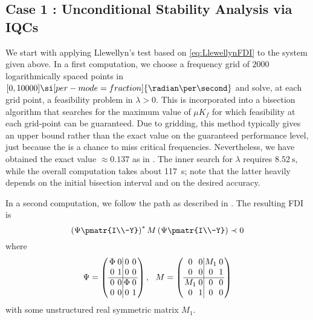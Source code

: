 \subsection{Case 1 : Unconditional Stability Analysis via IQCs}\label{sec:numcase1}
We start with applying Llewellyn's test based on \eqref{eq:LlewellynFDI} to the system given above. In a first computation, we choose a frequency grid of $2000$ logarithmically spaced points in $[0,10000] \si[per-mode=fraction]{\radian\per\second}$ and solve, at each grid point, a feasibility problem in $\lambda>0$. This is incorporated into a bisection algorithm that searches for the maximum value of $\mu K_f$ for which feasibility at each grid-point can be guaranteed. Due to gridding, this method typically gives an upper bound rather than the exact value on the guaranteed performance level, just because the is a chance to miss critical frequencies. Nevertheless, we have obtained the exact value $\approx 0.137$ as in  \cite{willaert}. The inner search for $\lambda$ requires $\SI{8.52}{\second}$, while the overall computation takes about \SI{117}{\second}; note that the latter heavily depends on the initial bisection interval and on the desired accuracy.

In a second computation, we follow the path as described in . The resulting FDI is
\begin{equation} \left(\Psi \pmatr{I\\-Y}\right)^* M
\left(\Psi \pmatr{I\\-Y}\right)\prec 0\label{eq:numcase1FDI}
\end{equation}
where
\begin{equation}
\arraycolsep0.3ex
\Psi = \left (\begin{array}{cc|cc}\Phi &0&0&0\\0&1&0&0\\\hline 0&0&\Phi&0\\0&0&0&1
\end{array}\right ),\ \
{M} = \left(\begin{array}{cc|cc}
	 0&0 &M_1 &0\\
	 0&0&0&1\\\hline
	 M_1&0&0&0\\
	 0&1&0&0
\end{array}\right)
\label{eq:numcase1mult}
\end{equation}
with some unstructured real symmetric matrix $M_1$.

